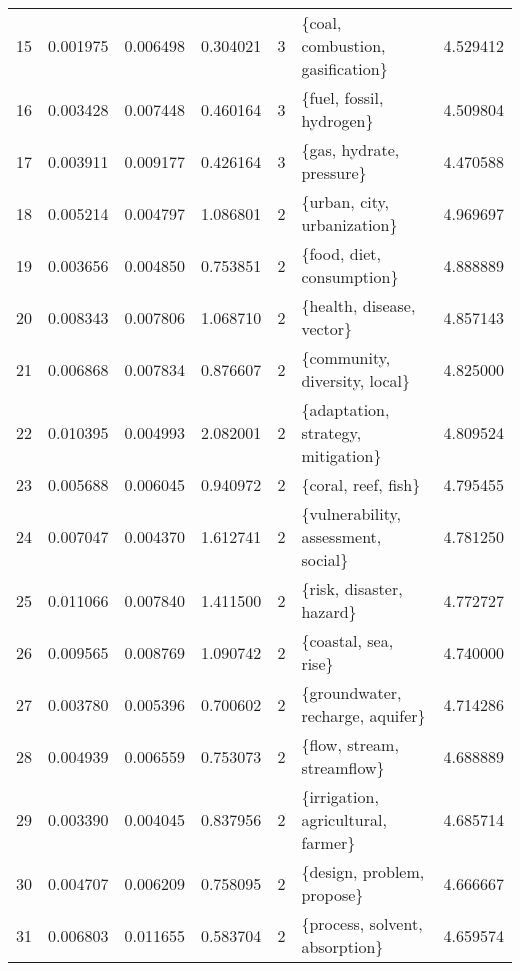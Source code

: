 \begin{tabular}{lrrrrlr}
15 &    0.001975 &  0.006498 &        0.304021 &           3 &        \{coal, combustion, gasification\} &  4.529412 \\
16 &    0.003428 &  0.007448 &        0.460164 &           3 &                \{fuel, fossil, hydrogen\} &  4.509804 \\
17 &    0.003911 &  0.009177 &        0.426164 &           3 &                \{gas, hydrate, pressure\} &  4.470588 \\
18 &    0.005214 &  0.004797 &        1.086801 &           2 &             \{urban, city, urbanization\} &  4.969697 \\
19 &    0.003656 &  0.004850 &        0.753851 &           2 &               \{food, diet, consumption\} &  4.888889 \\
20 &    0.008343 &  0.007806 &        1.068710 &           2 &               \{health, disease, vector\} &  4.857143 \\
21 &    0.006868 &  0.007834 &        0.876607 &           2 &           \{community, diversity, local\} &  4.825000 \\
22 &    0.010395 &  0.004993 &        2.082001 &           2 &      \{adaptation, strategy, mitigation\} &  4.809524 \\
23 &    0.005688 &  0.006045 &        0.940972 &           2 &                     \{coral, reef, fish\} &  4.795455 \\
24 &    0.007047 &  0.004370 &        1.612741 &           2 &     \{vulnerability, assessment, social\} &  4.781250 \\
25 &    0.011066 &  0.007840 &        1.411500 &           2 &                \{risk, disaster, hazard\} &  4.772727 \\
26 &    0.009565 &  0.008769 &        1.090742 &           2 &                    \{coastal, sea, rise\} &  4.740000 \\
27 &    0.003780 &  0.005396 &        0.700602 &           2 &        \{groundwater, recharge, aquifer\} &  4.714286 \\
28 &    0.004939 &  0.006559 &        0.753073 &           2 &              \{flow, stream, streamflow\} &  4.688889 \\
29 &    0.003390 &  0.004045 &        0.837956 &           2 &      \{irrigation, agricultural, farmer\} &  4.685714 \\
30 &    0.004707 &  0.006209 &        0.758095 &           2 &              \{design, problem, propose\} &  4.666667 \\
31 &    0.006803 &  0.011655 &        0.583704 &           2 &          \{process, solvent, absorption\} &  4.659574 \\

\end{tabular}

